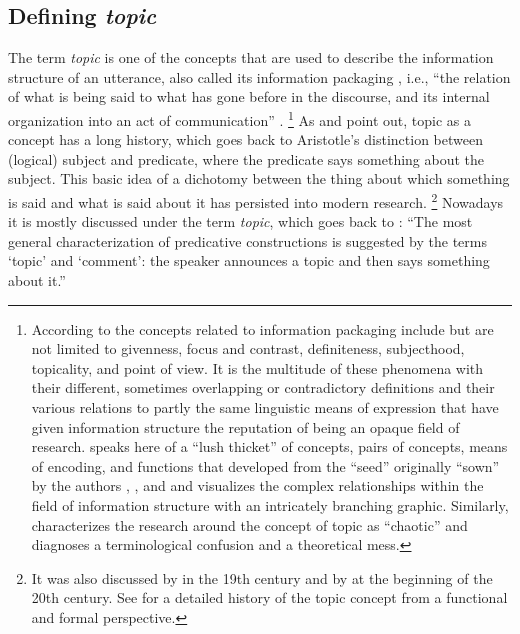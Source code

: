 \subsection{Defining \emph{topic}}
 \label{sec:topicality.lit}
The term \textit{topic} is one of the concepts that are used to describe the information structure \citep{halliday1967} of an utterance, also called its information packaging \citep{chafe1976}, i.e., ``the relation of what is being said to what has gone before in the discourse, and its internal organization into an act of communication'' \citep[199]{halliday1967}.%
\footnote{According to \citet[28]{chafe1976} the concepts related to information packaging include but are not limited to givenness, focus  and contrast, definiteness, subjecthood, topicality, and point of view.
It is the multitude of these phenomena with their different, sometimes overlapping or contradictory definitions and their various relations to partly the same linguistic means of expression that have given information structure   the reputation of being an opaque field of research.
\citet[207]{musan2002} speaks here of a ``lush thicket'' of concepts, pairs of concepts, means of encoding, and functions that developed from the ``seed'' originally ``sown'' by the authors \citet{weil1844}, \citet{gabelentz1868}, and \citet{paul1919} and visualizes the complex relationships within the field of information structure with an intricately branching graphic.
Similarly, \citet[11]{molnar1991} characterizes the research around the concept of topic as ``chaotic'' and diagnoses a terminological confusion and a theoretical mess.}
%
As \citet[118]{lambrecht1994} and \citet[26]{musan2017} point out, topic as a concept has a long history, which goes back to Aristotle's distinction between (logical) subject and predicate, where the predicate says something about the subject.
This basic idea of a dichotomy between the thing about which something is said and what is said about it has persisted into modern research.%
\footnote{It was also discussed by \citet[378]{gabelentz1868} in the 19th century and by \citet[12]{paul1919} at the beginning of the 20th century.
See \citet[13--40]{molnar1991} for a detailed history of the topic concept from a functional and formal perspective.}
%
Nowadays it is mostly discussed under the term \textit{topic}, which goes back to \citet[201]{hockett1958}: 
``The most general characterization of predicative constructions is suggested by the terms `topic' and `comment': the speaker announces a topic and then says something about it.''%
